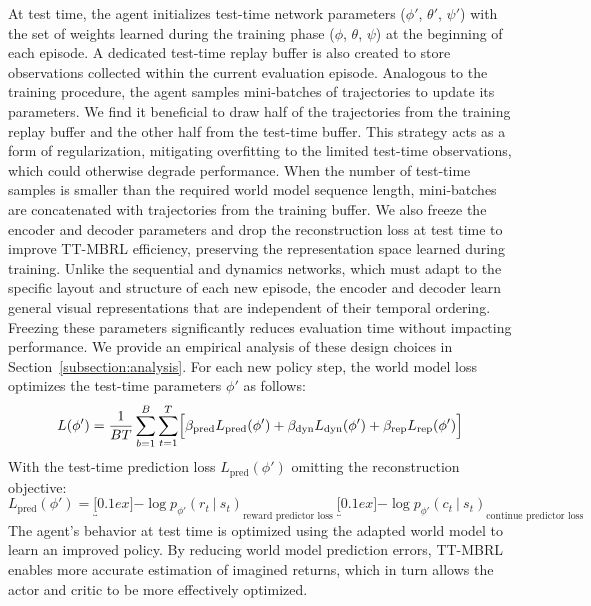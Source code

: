At test time, the agent initializes test-time network parameters ($\phi'$, $\theta'$, $\psi'$) with the set of weights learned during the training phase ($\phi$, $\theta$, $\psi$) at the beginning of each episode. A dedicated test-time replay buffer is also created to store observations collected within the current evaluation episode. Analogous to the training procedure, the agent samples mini-batches of trajectories to update its parameters. We find it beneficial to draw half of the trajectories from the training replay buffer and the other half from the test-time buffer. This strategy acts as a form of regularization, mitigating overfitting to the limited test-time observations, which could otherwise degrade performance. When the number of test-time samples is smaller than the required world model sequence length, mini-batches are concatenated with trajectories from the training buffer. 
We also freeze the encoder and decoder parameters and drop the reconstruction loss at test time to improve TT-MBRL efficiency, preserving the representation space learned during training. Unlike the sequential and dynamics networks, which must adapt to the specific layout and structure of each new episode, the encoder and decoder learn general visual representations that are independent of their temporal ordering. Freezing these parameters significantly reduces evaluation time without impacting performance. We provide an empirical analysis of these design choices in Section~\ref{subsection:analysis}.
For each new policy step, the world model loss optimizes the test-time parameters $\phi'$ as follows:
\begin{equation}
L(\phi') = \frac{1}{BT}\sum_{b=1}^{B}\sum_{t=1}^{T}\Bigr[\beta_{\text{pred}}L_{\text{pred}}(\phi') + \beta_{\text{dyn}}L_{\text{dyn}}(\phi') + \beta_{\text{rep}}L_{\text{rep}}(\phi')\Bigl]
\end{equation}
With the test-time prediction loss $L_{\text{pred}}(\phi')$ omitting the reconstruction objective:
\begin{equation}
L_{\text{pred}}(\phi') = \underbracket[0.1ex]{-\log p_{\phi'}(r_{t}\ |\ s_{t})}_{\text{reward predictor loss}}\ \underbracket[0.1ex]{-\log p_{\phi'}(c_{t}\ |\ s_{t})}_{\text{continue predictor loss}}
\end{equation}
The agent's behavior at test time is optimized using the adapted world model to learn an improved policy. By reducing world model prediction errors, TT-MBRL enables more accurate estimation of imagined returns, which in turn allows the actor and critic to be more effectively optimized.